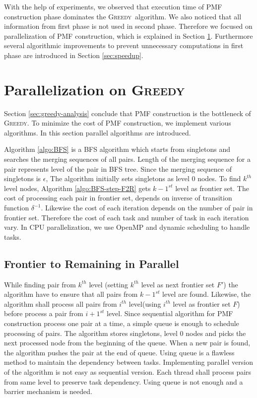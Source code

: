 \documentclass[12pt]{article}
\newcommand{\comment}[2]{{\color{red}{\bf (#1: #2)}}}
\newcommand{\greedyAlgo}{\textsc{Greedy}}
\begin{document}
With the help of experiments, we observed that execution time of PMF construction phase dominates the \greedyAlgo\ algorithm. We also noticed that all information from first phase is not used in second phase. Therefore we focused on parallelization of PMF construction, which is explained in Section \ref{sec:parallel}. Furthermore several algorithmic improvements to prevent unnecessary computations in first phase are introduced in Section \ref{sec:speedup}.


\clearpage
\section{Parallelization on \greedyAlgo}
\label{sec:parallel}

Section \ref{sec:greedy-analysis} conclude that PMF construction is the bottleneck of \greedyAlgo . To minimize the cost of PMF construction, we implement various algorithms. In this section parallel algorithms are introduced.

Algorithm \ref{algo:BFS} is a BFS algorithm which starts from singletons and searches the merging sequences of all pairs. Length of the merging sequence for a pair represents level of the pair in BFS tree. Since the merging sequence of singletons is $\epsilon$, The algorithm initially sets singletons as level 0 nodes. To find $k^{th}$ level nodes, Algorithm \ref{algo:BFS-step-F2R} gets $k-1^{st}$ level as frontier set. The cost of processing each pair in frontier set, depends on inverse of transition function $\delta^{-1}$. Likewise the cost of each iteration depends on the number of pair in frontier set. Therefore the cost of each task and number of task in each iteration vary. In CPU parallelization, we use OpenMP and dynamic scheduling to handle tasks. 

\comment{sertac}{BFS icin ornek figure cizilebilir}

\subsection{Frontier to Remaining in Parallel}
\label{sec:BFS-F2R-parallel}

While finding pair from $k^{th}$ level (setting $k^{th}$ level as next frontier set $F'$) the algorithm have to ensure that all pairs from $k-1^{st}$ level are found. Likewise, the algorithm shall process all pairs from $i^{th}$ level(using $i^{th}$ level as frontier set $F$) before process a pair from $i+1^{st}$ level. Since sequential algorithm for PMF construction process one pair at a time, a simple queue is enough to schedule processing of pairs. The algorithm stores singletons, level 0 nodes and picks the next processed node from the beginning of the queue. When a new pair is found, the algorithm pushes the pair at the end of queue. Using queue is a flawless method to maintain the dependency between tasks. Implementing parallel version of the algorithm is not easy as sequential version. Each thread shall process pairs from same level to preserve task dependency. Using queue is not enough and a barrier mechanism is needed.
\end{document}
